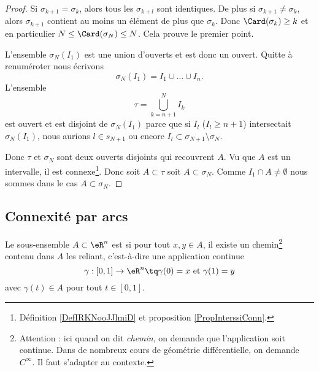 \begin{proof}
    Si \( \sigma_{k+1}=\sigma_k\), alors tous les \( \sigma_{k+l}\) sont identiques. De plus si \( \sigma_{k+1}\neq \sigma_k\), alors \( \sigma_{k+1}\) contient au moins un élément de plus que \( \sigma_k\). Donc \( \Card(\sigma_k)\geq k\) et en particulier \( N\leq \Card(\sigma_N)\leq N\). Cela prouve le premier point.

    L'ensemble \( \sigma_N(I_1)\) est une union d'ouverts et est donc un ouvert. Quitte à renuméroter nous écrivons
    \begin{equation}
        \sigma_N(I_1)=I_1\cup \ldots \cup I_n.
    \end{equation}
    L'ensemble 
    \begin{equation}
        \tau=\bigcup_{k=n+1}^NI_k
    \end{equation}
    est ouvert et est disjoint de \( \sigma_N(I_1)\) parce que si \( I_l\) ($I_l\geq n+1$) intersectait \( \sigma_N(I_1)\), nous aurions \( l\in s_{N+1}\) ou encore \( I_l\subset \sigma_{N+1}\setminus\sigma_N\).

    Donc \( \tau\) et \( \sigma_N\) sont deux ouverts disjoints qui recouvrent \( A\). Vu que \( A\) est un intervalle, il est connexe\footnote{Définition \ref{DefIRKNooJJlmiD} et proposition \ref{PropInterssiConn}.}. Donc soit \( A\subset \tau\) soit \( A\subset \sigma_N\). Comme \( I_1\cap A\neq \emptyset\) nous sommes dans le cas \( A\subset \sigma_N\).
\end{proof}


\subsection{Connexité par arcs}

\begin{definition}
  Le sous-ensemble $A \subset \eR^n$ est  si pour tout $x, y \in A$, il existe un chemin\footnote{Attention : ici quand on dit \emph{chemin}, on demande que l'application soit continue. Dans de nombreux cours de géométrie différentielle, on demande $ C^{\infty}$. Il faut s'adapter au contexte.} contenu dans $A$ les reliant, c'est-à-dire une application continue
  \begin{equation*}
    \gamma : [0,1] \to \eR^n \tq \gamma(0) = x~\text{et}~\gamma(1) = y
  \end{equation*}
  avec $\gamma(t) \in A$ pour tout $t\in [0,1]$.
\end{definition}

